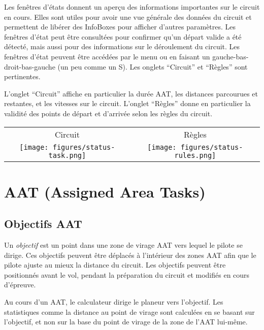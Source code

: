 Les fenêtres d'états donnent un aperçu des informations importantes sur le circuit en cours. 
 Elles sont utiles pour avoir une
vue générale des données du circuit et permettent de libérer des InfoBoxes pour afficher
d'autres paramètres. Les fenêtres d'état peut être consultées pour confirmer
qu'un départ valide a été détecté, mais aussi pour des informations sur le déroulement du circuit. 
Les fenêtres d'état peuvent être accédées par le menu ou en faisant un gauche-bas-droit-bas-gauche (un peu comme un S). Les onglets ``Circuit'' et ``Règles'' sont pertinentes.

L'onglet ``Circuit'' affiche en particulier la durée AAT, les distances parcourues et restantes, et les vitesses sur le circuit. 
L'onglet ``Règles'' donne en particulier la validité des points de départ et d'arrivée selon les règles du circuit.
\begin{center}
\begin{tabular}{c c}
Circuit & Règles \\
\texttt{[image: figures/status-task.png]} &
\texttt{[image: figures/status-rules.png]} \\
\end{tabular}
\end{center}

\section{AAT (Assigned Area Tasks)}\label{sec:aat-tasks}

\subsection*{Objectifs AAT}

Un \emph{objectif} est un point dans une zone de virage AAT vers lequel le pilote
se dirige. Ces objectifs peuvent être déplacés à l'intérieur des zones AAT afin
que le pilote ajuste au mieux la distance du circuit. Les objectifs peuvent être positionnés
avant le vol, pendant la préparation du circuit et modifiés en cours d'épreuve.

Au cours d'un AAT, le calculateur dirige le planeur vers l'objectif.
Les statistiques comme la distance au point de virage sont calculées en se basant sur
l'objectif, et non sur la base du point de virage de la zone de l'AAT lui-même.

